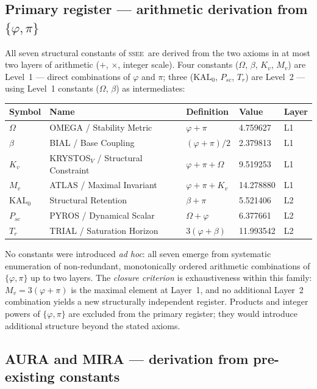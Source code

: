 \documentclass[12pt,a4paper]{article}
\newcommand{\SSEE}{\ifmmode\mathrm{SSEE}\else\textsc{ssee}\fi}
\begin{document}
\subsection*{Primary register — arithmetic derivation from $\{\varphi,\pi\}$}

All seven structural constants of \SSEE\ are derived from the two axioms
in at most two layers of arithmetic ($+$, $\times$, integer scale).
Four constants ($\Omega$, $\beta$, $K_v$, $M_v$) are Level~1 — direct
combinations of $\varphi$ and $\pi$; three ($\mathrm{KAL}_0$, $P_{sc}$, $T_r$)
are Level~2 — using Level~1 constants ($\Omega$, $\beta$) as intermediates:

\begin{center}
\small
\begin{tabular}{lllll}
\toprule
Symbol & Name & Definition & Value & Layer\\
\midrule
$\Omega$ & OMEGA / Stability Metric & $\varphi+\pi$ & 4.759627 & L1\\
$\beta$  & BIAL / Base Coupling     & $(\varphi+\pi)/2$ & 2.379813 & L1\\
$K_v$    & KRYSTOS$_V$ / Structural Constraint & $\varphi+\pi+\Omega$ & 9.519253 & L1\\
$M_v$    & ATLAS / Maximal Invariant & $\varphi+\pi+K_v$ & 14.278880 & L1\\
\midrule
$\mathrm{KAL}_0$ & Structural Retention & $\beta+\pi$ & 5.521406 & L2\\
$P_{sc}$ & PYROS / Dynamical Scalar & $\Omega+\varphi$ & 6.377661 & L2\\
$T_r$    & TRIAL / Saturation Horizon & $3(\varphi+\beta)$ & 11.993542 & L2\\
\bottomrule
\end{tabular}
\end{center}

\noindent No constants were introduced \emph{ad hoc}: all seven emerge from
systematic enumeration of non-redundant, monotonically ordered arithmetic
combinations of $\{\varphi,\pi\}$ up to two layers.
The \emph{closure criterion} is exhaustiveness within this family: $M_v = 3(\varphi+\pi)$
is the maximal element at Layer~1, and no additional Layer~2 combination
yields a new structurally independent register.
Products and integer powers of $\{\varphi,\pi\}$ are excluded from the primary
register; they would introduce additional structure beyond the stated axioms.

\subsection*{AURA and MIRA — derivation from pre-existing constants}
\end{document}
